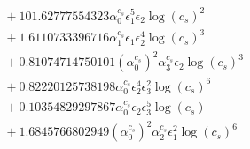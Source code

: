 \documentclass[10pt]{article}
\begin{document}
\begin{align*}
&{}  + 101.62777554323 \alpha_{0}^{c_s} \epsilon_{1}^{5} \epsilon_{2} \log{\left(c_{s} \right)}^{2} \\
&{}  + 1.6110733396716 \alpha_{1}^{c_s} \epsilon_{1} \epsilon_{2}^{4} \log{\left(c_{s} \right)}^{3} \\
&{}  + 0.81074714750101 \left(\alpha_{0}^{c_s}\right)^{2} \alpha_{3}^{c_s} \epsilon_{2} \log{\left(c_{s} \right)}^{3} \\
&{}  + 0.82220125738198 \alpha_{0}^{c_s} \epsilon_{2}^{4} \epsilon_{3}^{2} \log{\left(c_{s} \right)}^{6} \\
&{}  + 0.10354829297867 \alpha_{0}^{c_s} \epsilon_{2} \epsilon_{3}^{5} \log{\left(c_{s} \right)} \\
&{}  + 1.6845766802949 \left(\alpha_{0}^{c_s}\right)^{2} \alpha_{2}^{c_s} \epsilon_{1}^{2} \log{\left(c_{s} \right)}^{6}
\end{align*}
\end{document}
